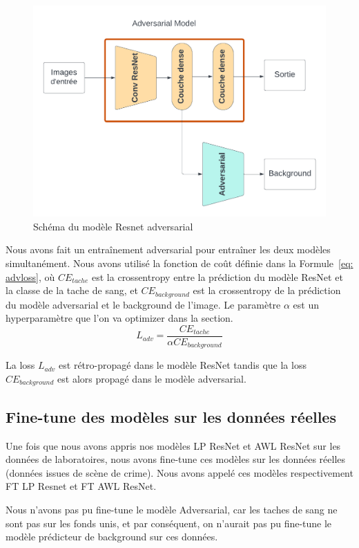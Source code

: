 \documentclass[a4paper]{article}
\begin{document}
\begin{figure}[ht]
    \centering
    \includegraphics[width=0.7\linewidth]{../asset/Resnet_adv.png}
    \caption{Schéma du modèle Resnet adversarial}
    \label{fig:resnet_adv}
\end{figure}

Nous avons fait un entraînement adversarial pour entraîner les deux modèles simultanément. Nous avons utilisé la fonction de coût définie dans la Formule~\ref{eq: advloss}, où $CE_{tache}$ est la crossentropy entre la prédiction du modèle ResNet et la classe de la tache de sang, et $CE_{background}$ est la crossentropy de la prédiction du modèle adversarial et le background de l'image. Le paramètre $\alpha$ est un hyperparamètre que l'on va optimizer dans la section.
\begin{equation}
    L_{adv} = \frac{CE_{tache}}{\alpha CE_{background}}
    \label{eq: advloss}
\end{equation}

La loss $L_{adv}$ est rétro-propagé dans le modèle ResNet tandis que la loss $CE_{background}$ est alors propagé dans le modèle adversarial.

\subsection{Fine-tune des modèles sur les données réelles}
Une fois que nous avons appris nos modèles LP ResNet et AWL ResNet sur les données de laboratoires, nous avons fine-tune ces modèles sur les données réelles (données issues de scène de crime). Nous avons appelé ces modèles respectivement FT LP Resnet et FT AWL ResNet.

Nous n'avons pas pu fine-tune le modèle Adversarial, car les taches de sang ne sont pas sur les fonds unis, et par conséquent, on n'aurait pas pu fine-tune le modèle prédicteur de background sur ces données.
\end{document}
